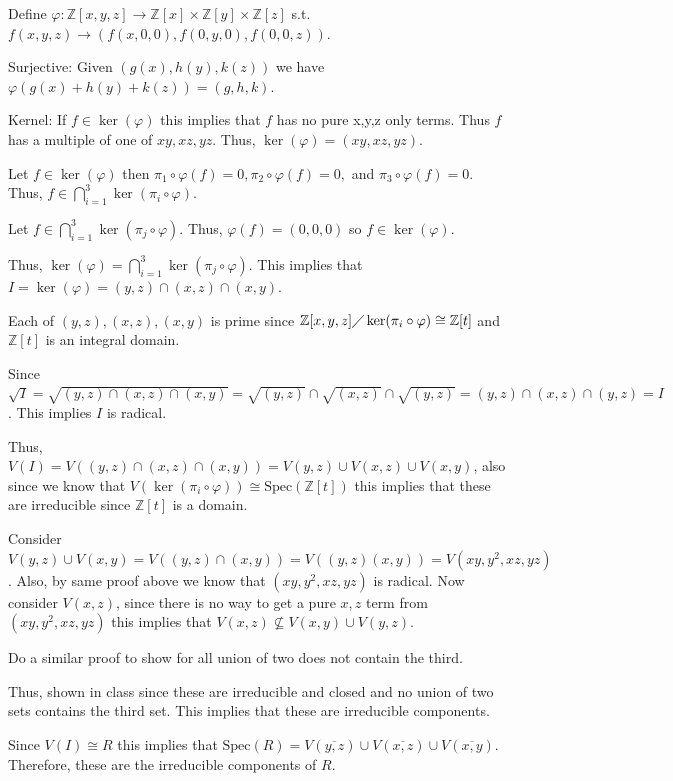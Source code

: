 \documentclass[12pt, letterpaper]{article}
\newcommand{\Z}{\mathbb{Z}}
\newcommand{\Spec}{\mathrm{Spec}}
\begin{document}
\begin{problemproof}
    Define $\varphi : \Z[x,y,z] \to \Z[x] \times \Z[y] \times \Z[z]$ s.t. $f(x,y,z) \to (f(x,0,0), f(0,y,0), f(0,0,z))$.

    Surjective: Given $(g(x),h(y),k(z))$ we have $\varphi(g(x)+h(y)+k(z))=(g,h,k)$.

    Kernel: If $f \in \ker(\varphi)$ this implies that $f$ has no pure x,y,z only terms. Thus $f$ has a multiple of one of $xy,xz,yz$. Thus, $\ker(\varphi) = (xy,xz,yz)$.

    Let $f \in \ker(\varphi)$ then $\pi_1 \circ \varphi(f)=0, \pi_2 \circ \varphi(f)=0,$ and $\pi_3 \circ \varphi(f)=0$. Thus, $f \in \bigcap_{i=1}^3 \ker(\pi_i \circ \varphi)$.

    Let $f \in \bigcap_{i=1}^3 \ker(\pi_j \circ \varphi)$. Thus, $\varphi(f)=(0,0,0)$ so $f \in \ker(\varphi)$.

    Thus, $\ker(\varphi) = \bigcap_{i=1}^3 \ker(\pi_j \circ \varphi)$. This implies that $I=\ker(\varphi)= (y,z) \cap (x,z) \cap (x,y)$.

    Each of $(y,z),(x,z),(x,y)$ is prime since $\Z[x,y,z] \diagup \ker(\pi_i \circ \varphi) \cong \Z[t]$ and $\Z[t]$ is an integral domain.

    Since $\sqrt{I} = \sqrt{(y,z) \cap (x,z) \cap (x,y)} = \sqrt{(y,z)} \cap \sqrt{(x,z)} \cap \sqrt{(y,z)} = (y,z) \cap (x,z) \cap (y,z)=I$. This implies $I$ is radical.

    Thus, $V(I) = V((y,z) \cap (x,z) \cap (x,y))=V(y,z) \cup V(x,z) \cup V(x,y)$, also since we know that $V(\ker(\pi_i \circ \varphi)) \cong \Spec(\Z[t])$ this implies that these are irreducible since $\Z[t]$ is a domain.

    Consider $V(y,z) \cup V(x,y) = V((y,z) \cap (x,y))=V((y,z)(x,y))=V(xy,y^2,xz,yz)$. Also, by same proof above we know that $(xy,y^2,xz,yz)$ is radical. Now consider $V(x,z)$, since there is no way to get a pure $x,z$ term from $(xy,y^2,xz,yz)$ this implies that $V(x,z) \nsubseteq V(x,y) \cup V(y,z)$.

    Do a similar proof to show for all union of two does not contain the third.

    Thus, shown in class since these are irreducible and closed and no union of two sets contains the third set. This implies that these are irreducible components.

    Since $V(I) \cong R$ this implies that $\Spec(R) = V(\overline{y,z}) \cup V(\overline{x,z}) \cup V(\overline{x,y})$. Therefore, these are the irreducible components of $R$.
\end{problemproof}
\end{document}
